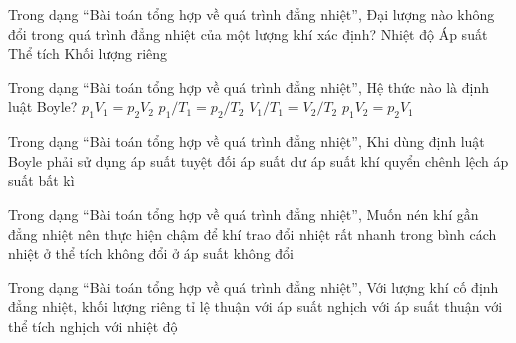 





\begin{ex}
Trong dạng “Bài toán tổng hợp về quá trình đẳng nhiệt”, Đại lượng nào không đổi trong quá trình đẳng nhiệt của một lượng khí xác định?
\choice
{\True Nhiệt độ}
{Áp suất}
{Thể tích}
{Khối lượng riêng}
\end{ex}

\begin{ex}
Trong dạng “Bài toán tổng hợp về quá trình đẳng nhiệt”, Hệ thức nào là định luật Boyle?
\choice
{\True $p_1V_1=p_2V_2$}
{$p_1/T_1=p_2/T_2$}
{$V_1/T_1=V_2/T_2$}
{$p_1V_2=p_2V_1$}
\end{ex}

\begin{ex}
Trong dạng “Bài toán tổng hợp về quá trình đẳng nhiệt”, Khi dùng định luật Boyle phải sử dụng
\choice
{\True áp suất tuyệt đối}
{áp suất dư}
{áp suất khí quyển}
{chênh lệch áp suất bất kì}
\end{ex}

\begin{ex}
Trong dạng “Bài toán tổng hợp về quá trình đẳng nhiệt”, Muốn nén khí gần đẳng nhiệt nên thực hiện
\choice
{\True chậm để khí trao đổi nhiệt}
{rất nhanh trong bình cách nhiệt}
{ở thể tích không đổi}
{ở áp suất không đổi}
\end{ex}

\begin{ex}
Trong dạng “Bài toán tổng hợp về quá trình đẳng nhiệt”, Với lượng khí cố định đẳng nhiệt, khối lượng riêng tỉ lệ
\choice
{\True thuận với áp suất}
{nghịch với áp suất}
{thuận với thể tích}
{nghịch với nhiệt độ}
\end{ex}

